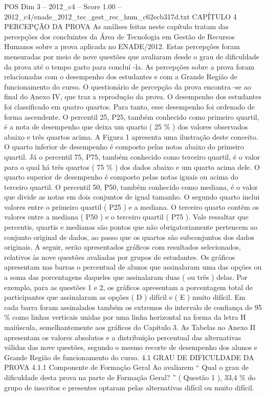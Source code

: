 \begin{textsample}{POS Dim 3 – 2012\_c4 – Score 1.00 – 2012\_c4/enade\_2012\_tec\_gest\_rec\_hum\_c62ecb317d.txt}  \label{ex:f3_pos_157}
CAPÍTULO 4 PERCEPÇÃO DA PROVA As análises feitas neste capítulo tratam das percepções dos concluintes da Área de Tecnologia em Gestão de Recursos Humanos sobre a prova aplicada no ENADE/2012.
Estas percepções foram mensuradas por meio de nove questões que avaliaram desde o grau de dificuldade da prova até o tempo gasto para concluí -la.
As percepções sobre a prova foram relacionadas com o desempenho dos estudantes e com a Grande Região de funcionamento do curso.
O questionário de percepção da prova encontra -se ao final do Anexo IV, que traz a reprodução da prova.
O desempenho dos estudantes foi classificado em quatro quartos.
Para tanto, esse desempenho foi ordenado de forma ascendente.
O percentil 25, P25, também conhecido como primeiro quartil, é a nota de desempenho que deixa um quarto ( 25 \% ) dos valores observados abaixo e três quartos acima.
A Figura 1 apresenta uma ilustração deste conceito.
O quarto inferior de desempenho é composto pelas notas abaixo do primeiro quartil.
Já o percentil 75, P75, também conhecido como terceiro quartil, é o valor para o qual há três quartos ( 75 \% ) dos dados abaixo e um quarto acima dele.
O quarto superior de desempenho é composto pelas notas iguais ou acima do terceiro quartil.
O percentil 50, P50, também conhecido como mediana, é o valor que divide as notas em dois conjuntos de igual tamanho.
O segundo quarto inclui valores entre o primeiro quartil ( P25 ) e a mediana.
O terceiro quarto contém os valores entre a mediana ( P50 ) e o terceiro quartil ( P75 ).
Vale ressaltar que percentis, quartis e medianas são pontos que não obrigatoriamente pertencem ao conjunto original de dados, ao passo que os quartos são subconjuntos dos dados originais.
A seguir, serão apresentados gráficos com resultados selecionados, relativos às nove questões avaliadas por grupos de estudantes.
Os gráficos apresentam nas barras o percentual de alunos que assinalaram uma das opções ou a soma das porcentagens daqueles que assinalaram duas ( ou três ) delas.
Por exemplo, para as questões 1 e 2, os gráficos apresentam a porcentagem total de participantes que assinalaram as opções ( D ) difícil e ( E ) muito difícil.
Em cada barra foram assinalados também os extremos do intervalo de confiança de 95 \% como linhas verticais unidas por uma linha horizontal na forma da letra H maiúscula, semelhantemente aos gráficos do Capítulo 3.
As Tabelas no Anexo II apresentam os valores absolutos e a distribuição percentual das alternativas válidas das nove questões, segundo o mesmo recorte de desempenho dos alunos e Grande Região de funcionamento do curso. 4.1 GRAU DE DIFICULDADE DA PROVA 4.1.1 Componente de Formação Geral Ao avaliarem “ Qual o grau de dificuldade desta prova na parte de Formação Geral? ” ( Questão 1 ), 33,4 \% do grupo de inscritos e presentes optaram pelas alternativas difícil ou muito difícil.

\end{textsample}
